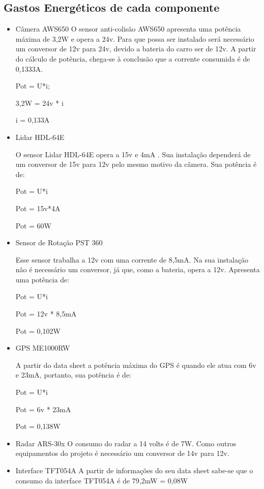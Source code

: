\subsection{Gastos Energéticos de cada componente}

\begin{itemize}

\item{Câmera AWS650}
O sensor anti-colisão AWS650 apresenta uma potência máxima de 3,2W e opera a 24v. Para que possa ser instalado será necessário um conversor de 12v para 24v, devido a bateria do carro ser de 12v. A partir do cálculo de potência, chega-se à
conclusão que a corrente consumida é de 0,1333A.

Pot = U*i;

3,2W = 24v * i

i = 0,133A

\item{Lidar HDL-64E}

O sensor Lidar HDL-64E opera a 15v e 4mA . Sua instalação dependerá de um conversor de 15v para 12v pelo mesmo motivo da câmera. Sua potência é de:

Pot = U*i

Pot = 15v*4A

Pot = 60W

\item{Sensor de Rotação PST 360}

Esse sensor trabalha a 12v com uma corrente de 8,5mA. Na sua instalação não é necessário um conversor, já que, como a bateria, opera a 12v. Apresenta uma potência de:

Pot = U*i

Pot = 12v * 8,5mA

Pot = 0,102W

\item{GPS ME1000RW}

A partir do data sheet a potência máxima do GPS é quando ele atua com 6v e 23mA, portanto, sua potência é de:

Pot = U*i

Pot = 6v * 23mA

Pot = 0,138W

\item{Radar  ARS-30x}
O consumo do radar a 14 volts é de 7W. Como outros equipamentos do projeto é necessário um conversor de 14v para 12v.

\item{Interface TFT054A}
A partir de informações do seu data sheet sabe-se que o consumo da interface
TFT054A é de 79,2mW = 0,08W


\end{itemize}
